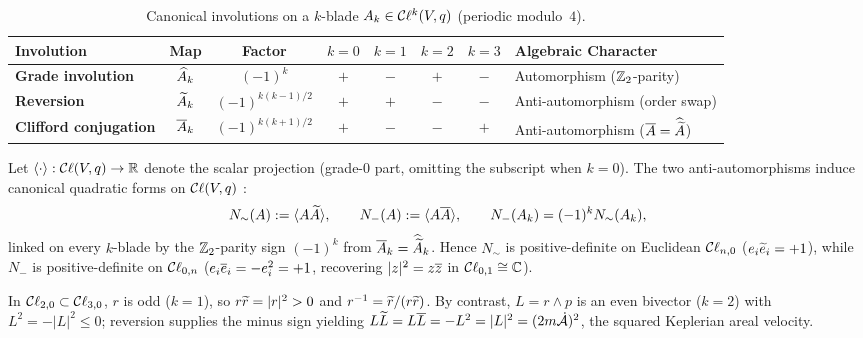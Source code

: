 \documentclass[11pt,a4paper]{article}
\begin{document}
\begin{table}[htbp]
  \centering
  \caption{Canonical involutions on a $k$-blade $A_k \in \mathcal{C}\ell^k(V, q)$
    (periodic modulo~$4$).}
  \label{tab:involutions}
  \small
  \renewcommand{\arraystretch}{1.15}
  \begin{tabularx}{\textwidth}{@{} >{\bfseries}l c c c c c c >{\raggedright\arraybackslash}X @{}}
    \toprule
    \textbf{Involution} & \textbf{Map} & \textbf{Factor} &
      $k{=}0$ & $k{=}1$ & $k{=}2$ & $k{=}3$ & \textbf{Algebraic Character} \\
    \midrule
    Grade involution & $\widehat{A}_k$ & $(-1)^k$ & $+$ & $-$ & $+$ & $-$ &
      Automorphism ($\mathbb{Z}_2$-parity) \\
    Reversion & $\widetilde{A}_k$ & $(-1)^{k(k-1)/2}$ & $+$ & $+$ & $-$ & $-$ &
      Anti-automorphism (order swap) \\
    Clifford conjugation & $\overline{A}_k$ & $(-1)^{k(k+1)/2}$ & $+$ & $-$ & $-$ & $+$ &
      Anti-automorphism ($\overline{A} = \widehat{\widetilde{A}}$) \\
    \bottomrule
  \end{tabularx}
\end{table}

\begin{keyresult}
  Let $\grade{\cdot} : \Cl(V, q) \to \R$ denote the scalar projection (grade-$0$
  part, omitting the subscript when $k = 0$).
  The two anti-automorphisms induce canonical quadratic forms on $\mathcal{C}\ell(V, q)$
  \cite[Sec.~3.3]{vazIntroductionCliffordAlgebras2016}:
  \begin{equation}
    \label{eq:involution-norms}
    N_{\sim}(A) := \grade{A\rev{A}}, \qquad
    N_{-}(A) := \grade{A\clconj{A}}, \qquad
    N_{-}(A_k) = (-1)^k N_{\sim}(A_k),
  \end{equation}
  linked on every $k$-blade by the $\mathbb{Z}_2$-parity sign $(-1)^k$ from
  $\overline{A}_k = \widehat{\widetilde{A}}_k$.
  Hence $N_\sim$ is positive-definite on Euclidean $\mathcal{C}\ell_{n,0}$
  ($e_i\widetilde{e}_i = +1$), while $N_-$ is positive-definite on $\mathcal{C}\ell_{0,n}$
  ($e_i\overline{e}_i = -e_i^2 = +1$, recovering $|z|^2 = z\overline{z}$ in
  $\mathcal{C}\ell_{0,1} \cong \mathbb{C}$).
\end{keyresult}

\begin{remark}
  In $\mathcal{C}\ell_{2,0} \subset \mathcal{C}\ell_{3,0}$, $r$ is odd ($k=1$), so $r\widetilde{r} = |r|^2 >
  0$ and $r^{-1} = \widetilde{r}/(r\widetilde{r})$.
  By contrast, $L = r \wedge p$ is an even bivector ($k=2$) with $L^2 =
  -|L|^2 \le 0$; reversion supplies the minus sign yielding
  $L\widetilde{L} = L\overline{L} = -L^2 = |L|^2 = (2m\dot{\mathcal{A}})^2$, the
  squared Keplerian areal velocity.
\end{remark}
\end{document}
